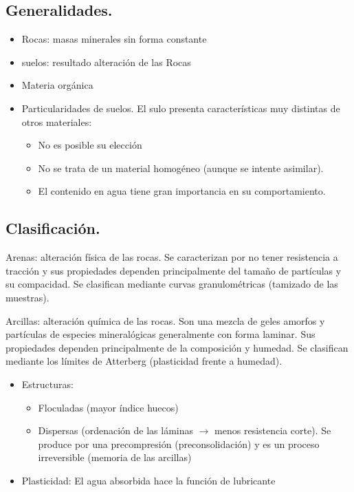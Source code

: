 \subsection{Generalidades.}
\begin{itemize}
    \item Rocas: masas minerales sin forma constante
    \item suelos: resultado alteración de las Rocas
    \item Materia orgánica
    \item Particularidades de suelos. El sulo presenta características muy distintas de otros materiales:
    \begin{itemize}
        \item No es posible su elección
        \item No se trata de un material homogéneo (aunque se intente asimilar).
        \item El contenido en agua tiene gran importancia en su comportamiento.
    \end{itemize}
\end{itemize}

\subsection{Clasificación.}
Arenas: alteración física de las rocas. Se caracterizan por no tener resistencia a tracción y sus propiedades dependen principalmente del tamaño de  partículas y su compacidad. Se clasifican mediante curvas granulométricas (tamizado de las muestras).

Arcillas: alteración química de las rocas. Son una mezcla de geles amorfos y partículas de especies mineralógicas generalmente con forma laminar. Sus propiedades dependen principalmente de la composición y humedad. Se clasifican mediante los límites de Atterberg (plasticidad frente a humedad).

\begin{itemize}
    \item Estructuras: 
    \begin{itemize}
        \item Floculadas (mayor índice huecos)
        \item Dispersas (ordenación de las láminas $\rightarrow$ menos resistencia corte). Se produce por una precompresión (preconsolidación) y es un proceso irreversible (memoria de las arcillas)
    \end{itemize}
    \item Plasticidad: El agua absorbida hace la función de lubricante
\end{itemize}

